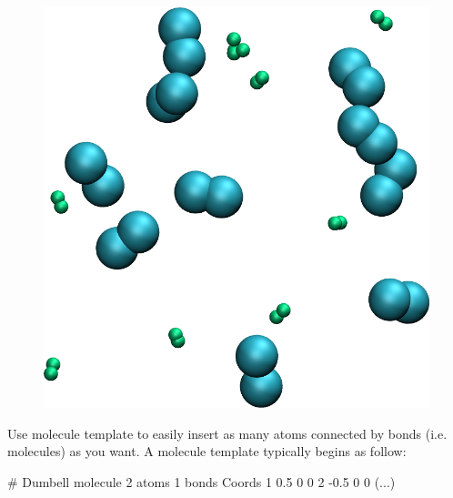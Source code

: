 \begin{figure}
\includegraphics[width=\linewidth]{tutorials/level0/lennard-jones-fluid/dumbell-light.png}
\end{figure}

\begin{tcolorbox}[colback=mylightblue!5!white,colframe=mylightblue!75!black,title=Hints]
Use molecule template to easily insert as many atoms connected
by bonds (i.e. molecules) as you want. A molecule 
template typically begins as follow:
\begin{lcverbatim}
# Dumbell molecule
2 atoms
1 bonds
Coords
1 0.5 0 0
2 -0.5 0 0
(...)
\end{lcverbatim}

\noindent \end{tcolorbox}

